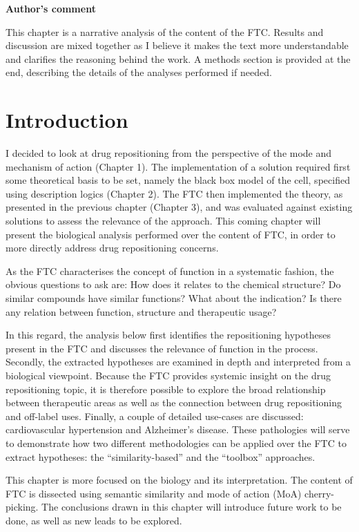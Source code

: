 \textbf{Author's comment}

This chapter is a narrative analysis of the content of the FTC. Results and discussion are mixed together as I believe it makes the text more understandable and clarifies the reasoning behind the work. A methods section is provided at the end, describing the details of the analyses performed if needed.

\hrulefill

\section{Introduction}
I decided to look at drug repositioning from the perspective of the mode and mechanism of action (Chapter 1). The implementation of a solution required first some theoretical basis to be set, namely the black box model of the cell, specified using description logics (Chapter 2). The FTC then implemented the theory, as presented in the previous chapter (Chapter 3), and was evaluated against existing solutions to assess the relevance of the approach. This coming chapter will present the biological analysis performed over the content of FTC, in order to more directly address drug repositioning concerns.

As the FTC characterises the concept of function in a systematic fashion, the obvious questions to ask are: How does it relates to the chemical structure? Do similar compounds have similar functions? What about the indication? Is there any relation between function, structure and therapeutic usage?

In this regard, the analysis below first identifies the repositioning hypotheses present in the FTC and discusses the relevance of function in the process. Secondly, the extracted hypotheses are examined in depth and interpreted from a biological viewpoint. Because the FTC provides systemic insight on the drug repositioning topic, it is therefore possible to explore the broad relationship between therapeutic areas as well as the connection between drug repositioning and off-label uses. Finally, a couple of detailed use-cases are discussed: cardiovascular hypertension and Alzheimer's disease. These pathologies will serve to demonstrate how two different methodologies can be applied over the FTC to extract hypotheses:  the “similarity-based” and the “toolbox” approaches.

This chapter is more focused on the biology and its interpretation. The content of FTC is dissected using semantic similarity and mode of action (MoA) cherry-picking. The conclusions drawn in this chapter will introduce future work to be done, as well as new leads to be explored.

